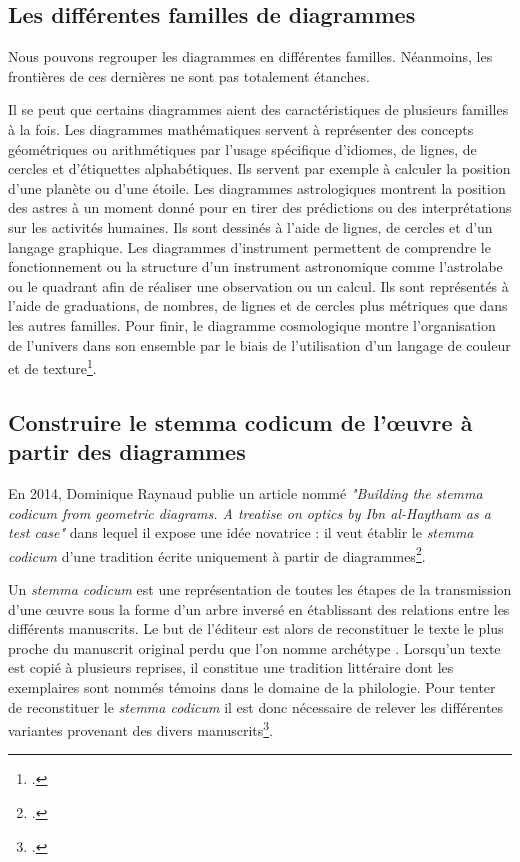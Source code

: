 \subsection{Les différentes familles de diagrammes}
Nous pouvons regrouper les diagrammes en différentes familles.
Néanmoins, les frontières de ces dernières ne sont pas totalement étanches.

Il se peut que certains diagrammes aient des caractéristiques de plusieurs familles à la fois.
Les diagrammes mathématiques servent à représenter des concepts géométriques ou arithmétiques par l'usage spécifique d'idiomes, de lignes, de cercles et d'étiquettes alphabétiques.
Ils servent par exemple à calculer la position d'une planète ou d'une étoile.
Les diagrammes astrologiques montrent la position des astres à un moment donné pour en tirer des prédictions ou des interprétations sur les activités humaines.
Ils sont dessinés à l'aide de lignes, de cercles et d'un langage graphique.
Les diagrammes d'instrument permettent de comprendre le fonctionnement ou la structure d'un instrument astronomique comme l'astrolabe ou le quadrant afin de réaliser une observation ou un calcul.
Ils sont représentés à l'aide de graduations, de nombres, de lignes et de cercles plus métriques que dans les autres familles.
Pour finir, le diagramme cosmologique montre l'organisation de l'univers dans son ensemble par le biais de l'utilisation d'un langage de couleur et de texture\footcite{Conference2025Long2025}.

\subsection{Construire le stemma codicum de l'œuvre à partir des diagrammes}

En 2014, Dominique Raynaud publie un article nommé \textit{"Building the stemma codicum from geometric diagrams.
A treatise on optics by Ibn al-Haytham as a test case"} dans lequel il expose une idée novatrice : il veut établir le \textit{stemma codicum} d'une tradition écrite uniquement à partir de diagrammes\footcite{raynaudBuildingStemmaCodicum2014}.

Un \textit{stemma codicum} est une représentation de toutes les étapes de la transmission d'une œuvre sous la forme d'un arbre inversé en établissant des relations entre les différents manuscrits.
Le but de l'éditeur est alors de reconstituer le texte le plus proche du manuscrit original perdu que l'on nomme \og archétype \fg.
Lorsqu'un texte est copié à plusieurs reprises, il constitue une \og tradition littéraire \fg dont les exemplaires sont nommés \og témoins \fg dans le domaine de la philologie.
Pour tenter de reconstituer le \textit{stemma codicum} il est donc nécessaire de relever les différentes variantes provenant des divers manuscrits\footcite{pouliquenUsingLatticesReconstructing}.

